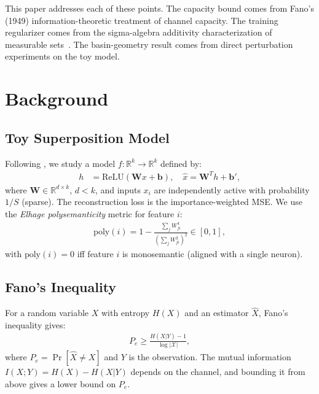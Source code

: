 \documentclass[11pt]{article}
\newcommand{\poly}{\mathrm{poly}}
\begin{document}
This paper addresses each of these points. The capacity bound comes from Fano's (1949)
information-theoretic treatment of channel capacity. The training regularizer comes from
the sigma-algebra additivity characterization of measurable sets~\citep{halmos1950measure}.
The basin-geometry result comes from direct perturbation experiments on the toy model.

\section{Background}

\subsection{Toy Superposition Model}

Following \citet{elhage2022toy}, we study a model $f: \mathbb{R}^k \to \mathbb{R}^k$ defined by:
\begin{align}
    h &= \mathrm{ReLU}(\mathbf{W}x + \mathbf{b}), \quad
    \hat{x} = \mathbf{W}^T h + \mathbf{b}',
\end{align}
where $\mathbf{W} \in \mathbb{R}^{d \times k}$, $d < k$, and inputs $x_i$ are independently
active with probability $1/S$ (sparse). The reconstruction loss is the importance-weighted MSE.
We use the \emph{Elhage polysemanticity} metric for feature $i$:
\begin{align}
    \poly(i) = 1 - \frac{\sum_j W_{ji}^4}{(\sum_j W_{ji}^2)^2} \in [0, 1],
\end{align}
with $\poly(i) = 0$ iff feature $i$ is monosemantic (aligned with a single neuron).

\subsection{Fano's Inequality}

For a random variable $X$ with entropy $H(X)$ and an estimator $\hat{X}$, Fano's inequality
gives:
\begin{align}
    P_e \geq \frac{H(X|Y) - 1}{\log|\mathcal{X}|},
\end{align}
where $P_e = \Pr[\hat{X} \neq X]$ and $Y$ is the observation. The mutual information
$I(X; Y) = H(X) - H(X|Y)$ depends on the channel, and bounding it from above gives a lower
bound on $P_e$.

\end{document}
